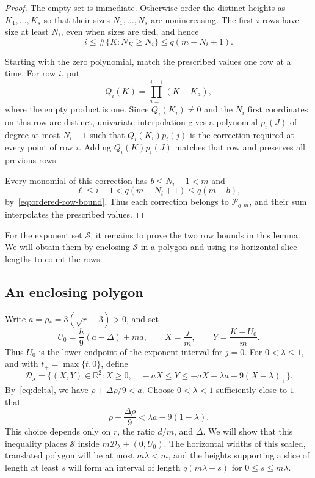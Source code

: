 \begin{proof}
The empty set is immediate. Otherwise order the distinct heights as
$K_1,\ldots,K_s$ so that their sizes $N_1,\ldots,N_s$ are
nonincreasing. The first $i$ rows have size at least $N_i$, even
when sizes are tied, and hence
\begin{equation}\label{eq:ordered-row-bound}
 i\le\#\{K:N_K\ge N_i\}\le q(m-N_i+1).
\end{equation}

Starting with the zero polynomial, match the prescribed values one
row at a time. For row $i$, put
\[
 Q_i(K)=\prod_{a=1}^{i-1}(K-K_a),
\]
where the empty product is one. Since $Q_i(K_i)\ne0$ and the $N_i$
first coordinates on this row are distinct, univariate interpolation
gives a polynomial $p_i(J)$ of degree at most $N_i-1$ such that
$Q_i(K_i)p_i(j)$ is the correction required at every point of row
$i$. Adding $Q_i(K)p_i(J)$ matches that row and preserves all
previous rows.

Every monomial of this correction has $b\le N_i-1<m$ and
\[
 \ell\le i-1<q(m-N_i+1)\le q(m-b),
\]
by~\eqref{eq:ordered-row-bound}. Thus each correction belongs to
$\mathcal P_{q,m}$, and their sum interpolates the prescribed values.
\end{proof}

For the exponent set $\mathcal S$, it remains to prove the two row
bounds in this lemma. We will obtain them by enclosing $\mathcal S$
in a polygon and using its horizontal slice lengths to count the rows.

\subsection{An enclosing polygon}

Write $a=\rho_*=3(\sqrt r-3)>0$, and set
\[
 U_0=\frac h9(a-\Delta)+ma,
 \qquad X=\frac jm,\qquad Y=\frac{K-U_0}{m}.
\]
Thus $U_0$ is the lower endpoint of the exponent interval for $j=0$.
For $0<\lambda\le1$, and with $t_+=\max\{t,0\}$, define
\begin{equation}\label{eq:enclosing-polygon}
 \mathcal D_\lambda
 =\bigl\{(X,Y)\in\mathbb R^2:
 X\ge0,\quad
 -aX\le Y\le-aX+\lambda a-9(X-\lambda)_+\bigr\}.
\end{equation}
By~\eqref{eq:delta}, we have $\rho+\Delta\rho/9<a$. Choose
$0<\lambda<1$ sufficiently close to $1$ that
\begin{equation}\label{eq:lambda}
 \rho+\frac{\Delta\rho}{9}<\lambda a-9(1-\lambda).
\end{equation}
This choice depends only on $r$, the ratio $d/m$, and $\Delta$.
We will show that this inequality places $\mathcal S$ inside
$m\mathcal D_\lambda+(0,U_0)$. The horizontal widths of this
scaled, translated polygon will be at most
$m\lambda<m$, and the heights supporting a slice of length at least
$s$ will form an interval of length $q(m\lambda-s)$ for
$0\le s\le m\lambda$.

